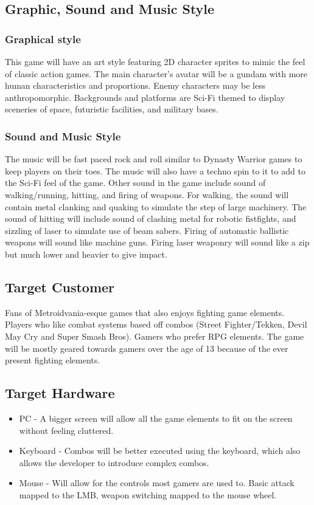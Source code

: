 \documentclass{article}
\begin{document}
\subsection*{Graphic, Sound and Music Style}
    \subsubsection*{Graphical style}
    This game will have an art style featuring 2D character sprites to mimic the feel of classic action games. The main character’s avatar will be a gundam with more human characteristics and proportions. Enemy characters may be less anthropomorphic. Backgrounds and platforms are Sci-Fi themed to display sceneries of space, futuristic facilities, and military bases.
    \subsubsection*{Sound and Music Style}
    The music will be fast paced rock and roll similar to Dynasty Warrior games to keep players on their toes. The music will also have a techno spin to it to add to the Sci-Fi feel of the game. Other sound in the game include sound of walking/running, hitting, and firing of weapons. For walking, the sound will contain metal clanking and quaking to simulate the step of large machinery. The sound of hitting will include sound of clashing metal for robotic fistfights, and sizzling of laser to simulate use of beam sabers. Firing of automatic ballistic weapons will sound like machine guns. Firing laser weaponry will sound like a zip but much lower and heavier to give impact.
    

\subsection*{Target Customer}
Fans of Metroidvania-esque games that also enjoys fighting game elements. Players who like combat systems based off combos (Street Fighter/Tekken, Devil May Cry and Super Smash Bros).
Gamers who prefer RPG elements. The game will be mostly geared towards gamers over the age of 13 because of the ever present fighting elements. 


\subsection*{Target Hardware}
    \begin{itemize}
        \item PC - A bigger screen will allow all the game elements to fit on the screen without feeling cluttered. 
        \item Keyboard - Combos will be better executed using the keyboard, which also allows the developer to introduce complex combos.
        \item Mouse - Will allow for the controls most gamers are used to. Basic attack mapped to the LMB, weapon switching mapped to the mouse wheel.
    \end{itemize}
    
\end{document}
